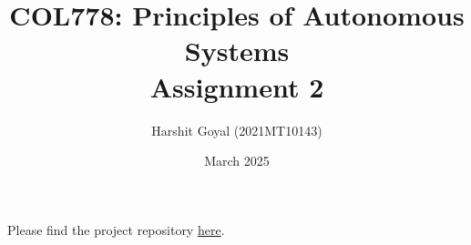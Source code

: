 \documentclass{article}
\title{COL778: Principles of Autonomous Systems\\Assignment 2}
\author{Harshit Goyal (2021MT10143)}
\date{March 2025}
\begin{document}
\maketitle
Please find the project repository \href{https://github.com/Harshit0143/COL778-Principles-of-Autonomous-System/tree/main/Assignment2}{here}.\\
\tableofcontents







\end{document}
